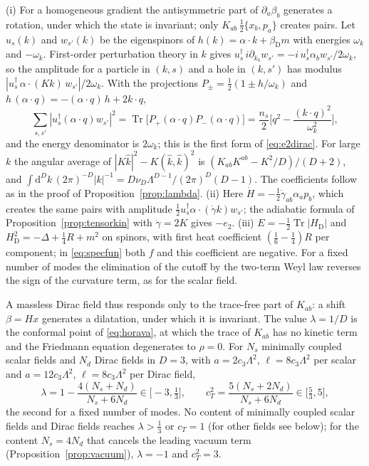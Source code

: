 \documentclass[11pt,a4paper]{article}
\makeatletter
\theoremstyle{stmt}
\theoremstyle{defn}
\theoremstyle{rmk}
\renewenvironment{proof}[1][\proofname]{\par\pushQED{\qed}\normalfont\topsep6\p@\@plus6\p@\relax
  \trivlist\item[\hskip\labelsep{\sffamily\itshape\small #1.}]\ignorespaces}{\popQED\endtrivlist\@endpefalse}
\numberwithin{equation}{section}
\DeclareMathOperator{\Tr}{Tr}
\newcommand{\dd}{\mathrm{d}}
\makeatother
\begin{document}
\begin{proof}
(i) For a homogeneous gradient the antisymmetric part of $\partial_a\beta_b$ generates a rotation, under which the state is invariant; only $K_{ab}\,\tfrac12\{x_b,p_a\}$ creates pairs. Let $u_s(k)$ and $w_{s'}(k)$ be the eigenspinors of $h(k)=\alpha\cdot k+\beta_{\mathrm D}m$ with energies $\omega_k$ and $-\omega_k$. First-order perturbation theory in $k$ gives $u_s^\dagger\,i\partial_{k_b}w_{s'}=-i\,u_s^\dagger\alpha_bw_{s'}/2\omega_k$, so the amplitude for a particle in $(k,s)$ and a hole in $(k,s')$ has modulus $|u_s^\dagger\,\alpha\!\cdot\!(Kk)\,w_{s'}|/2\omega_k$. With the projections $P_\pm=\tfrac12(1\pm h/\omega_k)$ and $h\,(\alpha\!\cdot\!q)=-(\alpha\!\cdot\!q)\,h+2k\!\cdot\!q$,
\[
\sum_{s,s'}|u_s^\dagger(\alpha\!\cdot\!q)w_{s'}|^2=\Tr\big[P_+(\alpha\!\cdot\!q)P_-(\alpha\!\cdot\!q)\big]=\frac{n_s}{2}\Big[q^2-\frac{(k\cdot q)^2}{\omega_k^2}\Big],
\]
and the energy denominator is $2\omega_k$; this is the first form of \eqref{eq:e2dirac}. For large $k$ the angular average of $|K\hat k|^2-K(\hat k,\hat k)^2$ is $(K_{ab}K^{ab}-K^2/D)/(D+2)$, and $\int\dd^Dk\,(2\pi)^{-D}|k|^{-1}=D\nu_D\Lambda^{D-1}/(2\pi)^D(D-1)$. The coefficients follow as in the proof of Proposition~\ref{prop:lambda}. (ii) Here $\dot H=-\tfrac12\dot\gamma_{ab}\alpha_ap_b$, which creates the same pairs with amplitude $\tfrac12u_s^\dagger\alpha\!\cdot\!(\dot\gamma k)w_{s'}$; the adiabatic formula of Proposition~\ref{prop:tensorkin} with $\dot\gamma=2K$ gives $-e_2$. (iii) $E=-\tfrac12\Tr|H_{\mathrm D}|$ and $H_{\mathrm D}^2=-\Delta+\tfrac14R+m^2$ on spinors, with first heat coefficient $(\tfrac16-\tfrac14)R$ per component; in \eqref{eq:specfun} both $f$ and this coefficient are negative. For a fixed number of modes the elimination of the cutoff by the two-term Weyl law reverses the sign of the curvature term, as for the scalar field.
\end{proof}

A massless Dirac field thus responds only to the trace-free part of $K_{ab}$: a shift $\beta=Hx$ generates a dilatation, under which it is invariant. The value $\lambda=1/D$ is the conformal point of \eqref{eq:horava}, at which the trace of $K_{ab}$ has no kinetic term and the Friedmann equation degenerates to $\rho=0$. For $N_s$ minimally coupled scalar fields and $N_d$ Dirac fields in $D=3$, with $a=2c_3\Lambda^2$, $\ell=8c_3\Lambda^2$ per scalar and $a=12c_3\Lambda^2$, $\ell=8c_3\Lambda^2$ per Dirac field,
\begin{equation}\label{eq:mixed}
\lambda=1-\frac{4(N_s+N_d)}{N_s+6N_d}\in\big[-3,\tfrac13\big],\qquad c_T^2=\frac{5(N_s+2N_d)}{N_s+6N_d}\in\big[\tfrac53,5\big],
\end{equation}
the second for a fixed number of modes. No content of minimally coupled scalar fields and Dirac fields reaches $\lambda>\tfrac13$ or $c_T=1$ (for other fields see below); for the content $N_s=4N_d$ that cancels the leading vacuum term (Proposition~\ref{prop:vacuum}), $\lambda=-1$ and $c_T^2=3$.
\end{document}
